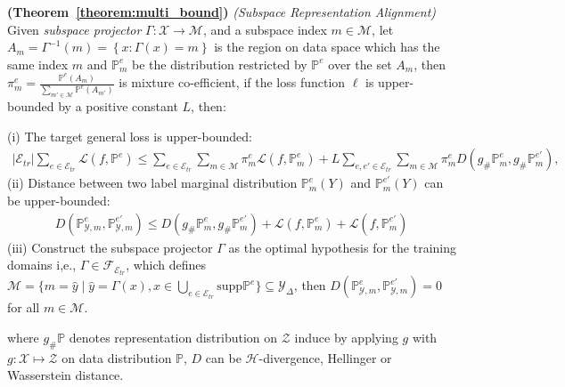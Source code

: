 \begin{theorem}
\label{theorem:multi_bound_A} \textbf{(Theorem~\ref{theorem:multi_bound})} 
\textit{(Subspace Representation Alignment)} Given \textit{subspace projector} $\Gamma: \mathcal{X}\rightarrow \mathcal{M}$, and a subspace index $m\in \mathcal{M}$, let $A_{m}=\Gamma^{-1}(m)=\left\{ x:\Gamma(x)=m\right\} $ is the region on data space which has the same index $m$ and $\mathbb{P}_{m}^{e}$ be the distribution restricted by $\mathbb{P}^{e}$ over the set $A_{m}$, then $\pi^{e}_m=\frac{\mathbb{P}^{e}\left(A_{m}\right)}{\sum_{m'\in\mathcal{M}}\mathbb{P}^{e}\left(A_{m'}\right)}$ is mixture co-efficient, if the loss function $\ell$ is upper-bounded by a positive
constant $L$, then:

(i)  The target general loss is upper-bounded: 
\begin{align*}
\left | \mathcal{E}_{tr} \right |\sum_{e\in \mathcal{E}_{tr}}\mathcal{L}\left ( f,\mathbb{P}^{e} \right )
\leq
\sum_{e\in \mathcal{E}_{tr}} \sum_{m\in\mathcal{M}}\pi^{e}_m
\mathcal{L}\left ( f,\mathbb{P}^{e}_{m} \right ) +
L\sum_{e, e'\in \mathcal{E}_{tr}}\sum_{m\in\mathcal{M}}\pi^{e}_{m}D\left ( g_{\#}\mathbb{P}^{e}_{m},g_{\#}\mathbb{P}^{e'}_{m} \right ),
\end{align*}
(ii) Distance between two label marginal distribution $\mathbb{P}^{e}_{m}(Y)$ and $\mathbb{P}^{e'}_{m}(Y)$ can be upper-bounded: 
\begin{equation*}
\begin{aligned}
D\left(\mathbb{P}^{e}_{\mathcal{Y},m},\mathbb{P}^{e'}_{\mathcal{Y},m}\right) \leq 
D\left ( g_{\#}\mathbb{P}^{e}_{m},g_{\#}\mathbb{P}^{e'}_{m} \right )
+\mathcal{L}\left ( f,\mathbb{P}^{e}_{m}\right )
+
\mathcal{L}\left ( f,\mathbb{P}^{e'}_{m} \right )
\end{aligned}
\end{equation*}
(iii) Construct the subspace projector $\Gamma$ as the optimal hypothesis for the training domains i,e., \(\Gamma \in \mathcal{F}_{\mathcal{E}_{tr}}\), which defines $\mathcal{M}=\{m=\hat{y}\mid \hat{y}=\Gamma(x), x\in\bigcup_{e\in\mathcal{E}_{tr}}\text{supp}\mathbb{P}^{e} \}\subseteq \mathcal{Y}_\Delta$, then
$
D\left(\mathbb{P}^{e}_{\mathcal{Y}, m},\mathbb{P}^{e'}_{\mathcal{Y},m}\right)=0$ for all \(m \in \mathcal{M}\).

where $g_{\#}\mathbb{P}$ denotes representation distribution on $\mathcal{Z}$ induce by applying $g$ with $g: \mathcal{X} \mapsto \mathcal{Z}$ on data distribution $\mathbb{P}$, $D$ can be $\mathcal{H}$-divergence, Hellinger or Wasserstein distance.
\end{theorem}

